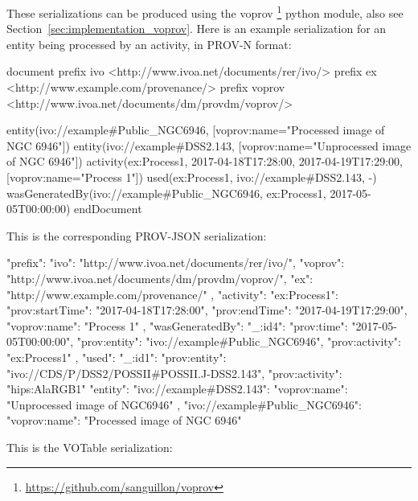 These serializations can be produced using the voprov \footnote{\url{https://github.com/sanguillon/voprov}} python module, also see Section~\ref{sec:implementation_voprov}.
Here is an example serialization for an entity being processed by an activity, in PROV-N format:

\begin{verbnobox}[\scriptsize]

document
  prefix ivo <http://www.ivoa.net/documents/rer/ivo/>
  prefix ex <http://www.example.com/provenance/>
  prefix voprov <http://www.ivoa.net/documents/dm/provdm/voprov/>

  entity(ivo://example#Public_NGC6946, [voprov:name="Processed image of NGC 6946"])
  entity(ivo://example#DSS2.143, [voprov:name="Unprocessed image of NGC 6946"])
  activity(ex:Process1, 2017-04-18T17:28:00, 2017-04-19T17:29:00, [voprov:name="Process 1"])
  used(ex:Process1, ivo://example#DSS2.143, -)
  wasGeneratedBy(ivo://example#Public_NGC6946, ex:Process1, 2017-05-05T00:00:00)
endDocument

\end{verbnobox}

This is the corresponding PROV-JSON serialization:

\begin{verbnobox}[\scriptsize]
{
  "prefix": {
    "ivo": "http://www.ivoa.net/documents/rer/ivo/",
    "voprov": "http://www.ivoa.net/documents/dm/provdm/voprov/",
    "ex": "http://www.example.com/provenance/"
  },
  "activity": {
    "ex:Process1": {
      "prov:startTime": "2017-04-18T17:28:00",
      "prov:endTime": "2017-04-19T17:29:00",
      "voprov:name": "Process 1"
    }
  },
  "wasGeneratedBy": {
    "_:id4": {
      "prov:time": "2017-05-05T00:00:00",
      "prov:entity": "ivo://example#Public_NGC6946",
      "prov:activity": "ex:Process1"
    }
  },
  "used": {
    "_:id1": {
      "prov:entity": "ivo://CDS/P/DSS2/POSSII#POSSII.J-DSS2.143",
      "prov:activity": "hips:AlaRGB1"
    }
  }
  "entity": {
    "ivo://example#DSS2.143": {
      "voprov:name": "Unprocessed image of NGC6946"
    },
    "ivo://example#Public_NGC6946": {
      "voprov:name": "Processed image of NGC 6946"
    }
  }
}
\end{verbnobox}

This is the VOTable serialization:

